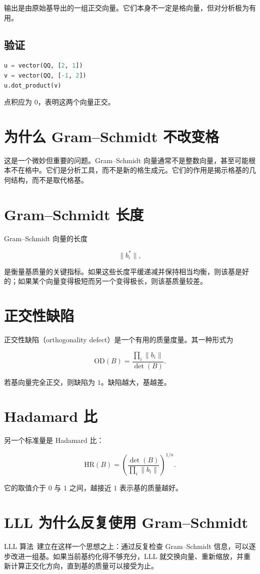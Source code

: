 输出是由原始基导出的一组正交向量。它们本身不一定是格向量，但对分析极为有用。

\subsection{验证}

\begin{lstlisting}[language=Python]
u = vector(QQ, [2, 1])
v = vector(QQ, [-1, 2])
u.dot_product(v)
\end{lstlisting}

点积应为 $0$，表明这两个向量正交。

\section{为什么 Gram--Schmidt 不改变格}
这是一个微妙但重要的问题。Gram--Schmidt 向量通常不是整数向量，甚至可能根本不在格中。它们是分析工具，而不是新的格生成元。它们的作用是揭示格基的几何结构，而不是取代格基。

\section{Gram--Schmidt 长度}
Gram--Schmidt 向量的长度

\[
\|b_i^*\|,
\]

是衡量基质量的关键指标。如果这些长度平缓递减并保持相当均衡，则该基是好的；如果某个向量变得极短而另一个变得极长，则该基质量较差。

\section{正交性缺陷}
正交性缺陷（orthogonality defect）是一个有用的质量度量。其一种形式为

\[
\mathrm{OD}(B)=\frac{\prod_i \|b_i\|}{\det(B)}.
\]

若基向量完全正交，则缺陷为 $1$。缺陷越大，基越差。

\section{Hadamard 比}
另一个标准量是 Hadamard 比：

\[
\mathrm{HR}(B)=\left(\frac{\det(B)}{\prod_i \|b_i\|}\right)^{1/n}.
\]

它的取值介于 $0$ 与 $1$ 之间，越接近 $1$ 表示基的质量越好。

\section{LLL 为什么反复使用 Gram--Schmidt}
LLL 算法~\cite{lll1982}建立在这样一个思想之上：通过反复检查 Gram--Schmidt 信息，可以逐步改进一组基。如果当前基约化得不够充分，LLL 就交换向量、重新缩放，并重新计算正交化方向，直到基的质量可以接受为止。

